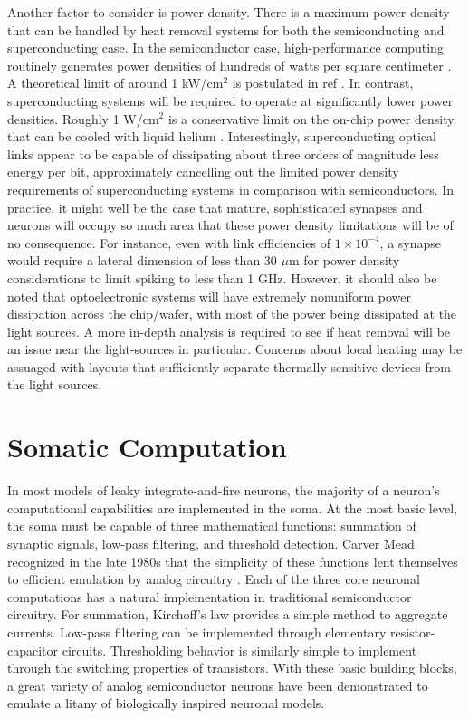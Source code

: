 \documentclass[twocolumn]{article}
\begin{document}
Another factor to consider is power density. There is a maximum power density that can be handled by heat removal systems for both the semiconducting and superconducting case. In the semiconductor case, high-performance computing routinely generates power densities of hundreds of watts per square centimeter \cite{tolpygo2016superconductor}. A theoretical limit of around 1 kW/cm$^2$ is postulated in ref \cite{zhirnov2003limits}. In contrast, superconducting systems will be required to operate at significantly lower power densities. Roughly 1 W/cm$^2$ is a conservative limit on the on-chip power density that can be cooled with liquid helium \cite{tolpygo2016superconductor}. Interestingly, superconducting optical links appear to be capable of dissipating about three orders of magnitude less energy per bit, approximately cancelling out the limited power density requirements of superconducting systems in comparison with semiconductors. In practice, it might well be the case that mature, sophisticated synapses and neurons will occupy so much area that these power density limitations will be of no consequence. For instance, even with link efficiencies of $1 \times 10^{-4}$, a synapse would require a lateral dimension of less than 30 $\mu$m for power density considerations to limit spiking to less than 1 GHz. However, it should also be noted that optoelectronic systems will have extremely nonuniform power dissipation across the chip/wafer, with most of the power being dissipated at the light sources. A more in-depth analysis is required to see if heat removal will be an issue near the light-sources in particular. Concerns about local heating may be assuaged with layouts that sufficiently separate thermally sensitive devices from the light sources.

\section{\label{sec:soma}Somatic Computation}
\quad In most models of leaky integrate-and-fire neurons, the majority of a neuron's computational capabilities are implemented in the soma. At the most basic level, the soma must be capable of three mathematical functions: summation of synaptic signals, low-pass filtering, and threshold detection. Carver Mead recognized in the late 1980s that the simplicity of these functions lent themselves to efficient emulation by analog circuitry \cite{mead1990neuromorphic}. Each of the three core neuronal computations has a natural implementation in traditional semiconductor circuitry. For summation, Kirchoff's law provides a simple method to aggregate currents. Low-pass filtering can be implemented through elementary resistor-capacitor circuits. Thresholding behavior is similarly simple to implement through the switching properties of transistors. With these basic building blocks, a great variety of analog semiconductor neurons have been demonstrated to emulate a litany of biologically inspired neuronal models.
\end{document}
